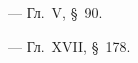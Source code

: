 \begin{lab:literature}

\item \SivuhinIII~--- Гл.~V, \S~90.

\item \Kalashnikov~--- Гл.~XVII, \S~178.

\end{lab:literature}
